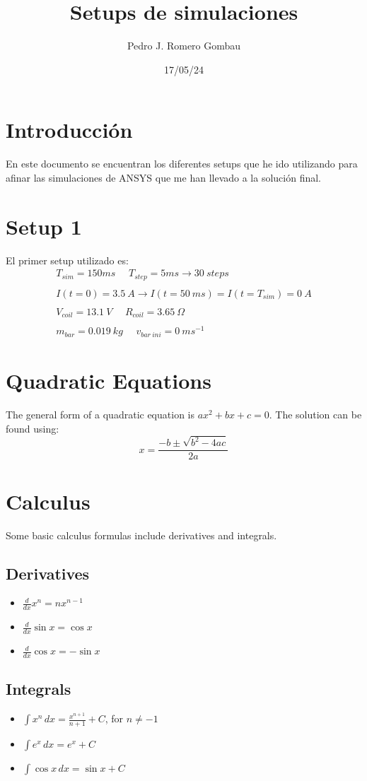\documentclass{article}
\title{Setups de simulaciones}
\author{Pedro J. Romero Gombau}
\date{17/05/24}
\begin{document}
\maketitle

\section{Introducción}
En este documento se encuentran los diferentes setups que he ido utilizando para afinar las simulaciones de ANSYS que me han llevado a la solución final.
\section{Setup 1}
El primer setup utilizado es:
\begin{align*}
    T_{sim}=150ms~~~~~~T_{step}=5ms\to30~steps
    \\~\\
    I(t=0)=3.5~A\to I(t=50~ms)=I(t=T_{sim})=0~A
    \\~\\
    V_{coil}=13.1~V~~~~~~R_{coil}=3.65~\Omega
    \\~\\
    m_{bar}=0.019~kg~~~~~~v_{bar~ini}=0~ms^{-1}
\end{align*}

\section{Quadratic Equations}
The general form of a quadratic equation is $ax^2 + bx + c = 0$. The solution can be found using:
\[ x = \frac{-b \pm \sqrt{b^2 - 4ac}}{2a} \]

\section{Calculus}
Some basic calculus formulas include derivatives and integrals.
\subsection{Derivatives}
\begin{itemize}
\item $\frac{d}{dx}x^n = nx^{n-1}$
\item $\frac{d}{dx}\sin x = \cos x$
\item $\frac{d}{dx}\cos x = -\sin x$
\end{itemize}

\subsection{Integrals}
\begin{itemize}
\item $\int x^n \, dx = \frac{x^{n+1}}{n+1} + C$, for $n \neq -1$
\item $\int e^x \, dx = e^x + C$
\item $\int \cos x \, dx = \sin x + C$
\end{itemize}
\end{document}
